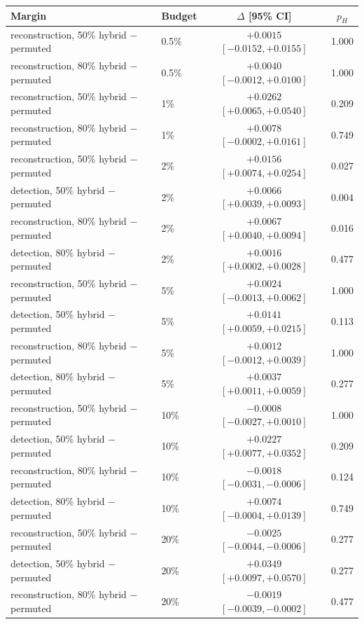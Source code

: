 \begin{tabular}{llcc}
\toprule
Margin & Budget & $\Delta$ [95\% CI] & $p_H$ \\
\midrule
reconstruction, 50\% hybrid $-$ permuted & 0.5\% & ${+}0.0015$ $[-0.0152, {+}0.0155]$ & 1.000 \\
reconstruction, 80\% hybrid $-$ permuted & 0.5\% & ${+}0.0040$ $[-0.0012, {+}0.0100]$ & 1.000 \\
reconstruction, 50\% hybrid $-$ permuted & 1\% & ${+}0.0262$ $[{+}0.0065, {+}0.0540]$ & 0.209 \\
reconstruction, 80\% hybrid $-$ permuted & 1\% & ${+}0.0078$ $[-0.0002, {+}0.0161]$ & 0.749 \\
reconstruction, 50\% hybrid $-$ permuted & 2\% & ${+}0.0156$ $[{+}0.0074, {+}0.0254]$ & 0.027 \\
detection, 50\% hybrid $-$ permuted & 2\% & ${+}0.0066$ $[{+}0.0039, {+}0.0093]$ & 0.004 \\
reconstruction, 80\% hybrid $-$ permuted & 2\% & ${+}0.0067$ $[{+}0.0040, {+}0.0094]$ & 0.016 \\
detection, 80\% hybrid $-$ permuted & 2\% & ${+}0.0016$ $[{+}0.0002, {+}0.0028]$ & 0.477 \\
reconstruction, 50\% hybrid $-$ permuted & 5\% & ${+}0.0024$ $[-0.0013, {+}0.0062]$ & 1.000 \\
detection, 50\% hybrid $-$ permuted & 5\% & ${+}0.0141$ $[{+}0.0059, {+}0.0215]$ & 0.113 \\
reconstruction, 80\% hybrid $-$ permuted & 5\% & ${+}0.0012$ $[-0.0012, {+}0.0039]$ & 1.000 \\
detection, 80\% hybrid $-$ permuted & 5\% & ${+}0.0037$ $[{+}0.0011, {+}0.0059]$ & 0.277 \\
reconstruction, 50\% hybrid $-$ permuted & 10\% & $-0.0008$ $[-0.0027, {+}0.0010]$ & 1.000 \\
detection, 50\% hybrid $-$ permuted & 10\% & ${+}0.0227$ $[{+}0.0077, {+}0.0352]$ & 0.209 \\
reconstruction, 80\% hybrid $-$ permuted & 10\% & $-0.0018$ $[-0.0031, -0.0006]$ & 0.124 \\
detection, 80\% hybrid $-$ permuted & 10\% & ${+}0.0074$ $[-0.0004, {+}0.0139]$ & 0.749 \\
reconstruction, 50\% hybrid $-$ permuted & 20\% & $-0.0025$ $[-0.0044, -0.0006]$ & 0.277 \\
detection, 50\% hybrid $-$ permuted & 20\% & ${+}0.0349$ $[{+}0.0097, {+}0.0570]$ & 0.277 \\
reconstruction, 80\% hybrid $-$ permuted & 20\% & $-0.0019$ $[-0.0039, -0.0002]$ & 0.477 \\

\end{tabular}
